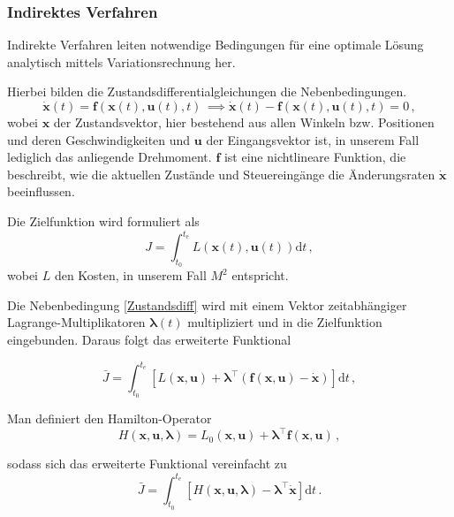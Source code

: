 \documentclass[]{scrartcl}
\begin{document}
\subsubsection{Indirektes Verfahren}
Indirekte Verfahren leiten notwendige Bedingungen für eine optimale Lösung analytisch mittels Variationsrechnung her.

Hierbei bilden die Zustandsdifferentialgleichungen die Nebenbedingungen.
\begin{equation}
\dot{\mathbf{x}}(t) = \mathbf{f}\left(\mathbf{x}(t), \mathbf{u}(t), t\right) \, \implies  \dot{\mathbf{x}}(t) - \mathbf{f}\left(\mathbf{x}(t), \mathbf{u}(t), t\right) = 0 \, ,
\label{Zustandsdiff}
\end{equation}
wobei $\mathbf{x}$ der Zustandsvektor, hier bestehend aus allen Winkeln bzw. Positionen und deren Geschwindigkeiten und $\mathbf{u}$ der Eingangsvektor ist, in unserem Fall lediglich das anliegende Drehmoment. $\mathbf{f}$ ist eine nichtlineare Funktion, die beschreibt, wie die aktuellen Zustände und Steuereingänge die Änderungsraten $\dot{\mathbf{x}}$ beeinflussen.

Die Zielfunktion wird formuliert als
\begin{equation}
J = \int_{t_0}^{t_{\mathrm{e}}} L\left(\mathbf{x}(t), \mathbf{u}(t)\right) \mathrm{d}t \, ,
\end{equation}
wobei $L$ den Kosten, in unserem Fall $M^2$ entspricht.

Die Nebenbedingung \eqref{Zustandsdiff} wird mit einem Vektor zeitabhängiger Lagrange-Multiplikatoren $\boldsymbol{\lambda}(t)$ multipliziert und in die Zielfunktion eingebunden. Daraus folgt das erweiterte Funktional

\begin{equation}
	\bar{J} = \int_{t_0}^{t_e} \left[ L(\mathbf{x}, \mathbf{u}) + \boldsymbol{\lambda}^{\top} \left( \mathbf{f}(\mathbf{x}, \mathbf{u}) - \dot{\mathbf{x}} \right) \right] \mathrm{d}t \, ,
\end{equation}

Man definiert den Hamilton-Operator
\begin{equation}
	H(\mathbf{x}, \mathbf{u}, \boldsymbol{\lambda}) = L_0(\mathbf{x}, \mathbf{u}) + \boldsymbol{\lambda}^{\top} \mathbf{f}(\mathbf{x}, \mathbf{u})\, ,
\end{equation}

sodass sich das erweiterte Funktional vereinfacht zu
\begin{equation}
	\bar{J} = \int_{t_0}^{t_e} \left[H(\mathbf{x}, \mathbf{u}, \boldsymbol{\lambda}) - \boldsymbol{\lambda}^{\top} \dot{\mathbf{x}} \right] \mathrm{d}t \, .
\end{equation}
\end{document}
